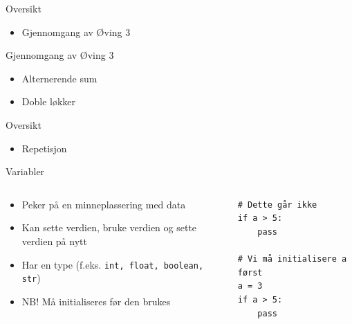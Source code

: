 \documentclass[screen, aspectratio=169]{beamer}
\begin{document}
{\begin{frame}[plain]
	\end{frame}
}

\begin{frame}{Oversikt}
	\begin{itemize}
		\item Gjennomgang av Øving 3
	\end{itemize}
\end{frame}

\begin{frame}{Gjennomgang av Øving 3}
	\begin{itemize}
		\item Alternerende sum
		\item Doble løkker
	\end{itemize}
\end{frame}

\begin{frame}{Oversikt}
	\begin{itemize}
		\item Repetisjon
	\end{itemize}
\end{frame}

\begin{frame}[fragile]{Variabler}
	\begin{columns}
		\begin{column}{.6\textwidth}
			\begin{itemize}
				\item Peker på en minneplassering med data
				\item Kan sette verdien, bruke verdien og sette verdien på nytt
				\item Har en type (f.eks. \lstinline|int, float, boolean, str|)
				\item NB! Må initialiseres før den brukes
			\end{itemize}
		\end{column}
		\begin{column}{.4\textwidth}
			\begin{lstlisting}
# Dette går ikke
if a > 5:
	pass

# Vi må initialisere a først
a = 3
if a > 5:
	pass
			\end{lstlisting}
		\end{column}
	\end{columns}
\end{frame}
\end{document}
